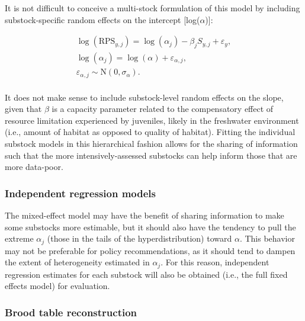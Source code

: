 \documentclass[12pt,]{book}
\theoremstyle{definition}
\theoremstyle{definition}
\theoremstyle{definition}
\theoremstyle{remark}
\begin{document}
It is not difficult to conceive a multi-stock formulation of this model
by including substock-specific random effects on the intercept
{[}log(\(\alpha\)){]}:

\begin{equation}
  \begin{split}
    \log(\text{RPS}_{y,j})=\log(\alpha_j)-\beta_j S_{y,j} + \varepsilon_y, \\
    \log(\alpha_j)=\log(\alpha) + \varepsilon_{\alpha,j}, \\
    \varepsilon_{\alpha,j} \sim \text{N}(0,\sigma_{\alpha}). \\
  \end{split}
\label{eq:lin-ricker-mixed}
\end{equation}

\noindent
It does not make sense to include substock-level random effects on the
slope, given that \(\beta\) is a capacity parameter related to the
compensatory effect of resource limitation experienced by juveniles,
likely in the freshwater environment (i.e., amount of habitat as opposed
to quality of habitat). Fitting the individual substock models in this
hierarchical fashion allows for the sharing of information such that the
more intensively-assessed substocks can help inform those that are more
data-poor.

\subsubsection{Independent regression models}\label{lm-methods}

\noindent
The mixed-effect model may have the benefit of sharing information to
make some substocks more estimable, but it should also have the tendency
to pull the extreme \(\alpha_j\) (those in the tails of the
hyperdistribution) toward \(\alpha\). This behavior may not be
preferable for policy recommendations, as it should tend to dampen the
extent of heterogeneity estimated in \(\alpha_j\). For this reason,
independent regression estimates for each substock will also be obtained
(i.e., the full fixed effects model) for evaluation.

\subsubsection{Brood table reconstruction}\label{lm-btable}
\end{document}
